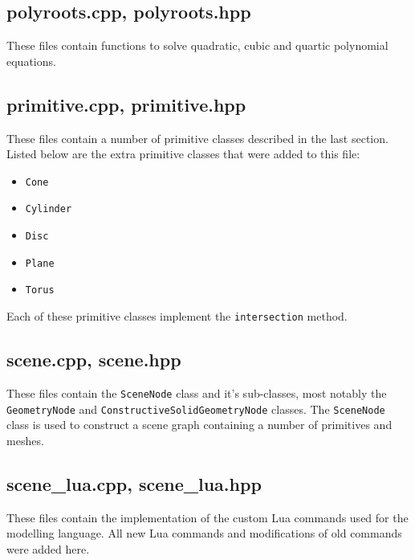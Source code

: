 \subsection*{polyroots.cpp, polyroots.hpp}
These files contain functions to solve quadratic, cubic and quartic polynomial
equations.

\subsection*{primitive.cpp, primitive.hpp}
These files contain a number of primitive classes described in the last section.
Listed below are the extra primitive classes that were added to this file:
\begin{itemize}
  \item \verb|Cone|
  \item \verb|Cylinder|
  \item \verb|Disc|
  \item \verb|Plane|
  \item \verb|Torus|
\end{itemize}
Each of these primitive classes implement the \verb|intersection| method.

\subsection*{scene.cpp, scene.hpp}
These files contain the \verb|SceneNode| class and it's sub-classes, most 
\newline notably the \verb|GeometryNode| and 
\verb|ConstructiveSolidGeometryNode| \newline classes. The \verb|SceneNode| 
class is used to construct a scene graph containing a number of primitives 
and meshes.

\subsection*{scene\_lua.cpp, scene\_lua.hpp}
These files contain the implementation of the custom Lua commands used for the
modelling language. All new Lua commands and modifications of old commands were
added here.

